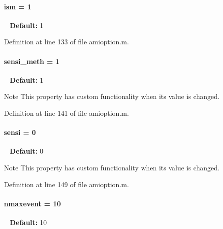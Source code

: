 \hypertarget{classamioption_aada9d6834569ad5c542cb8dc6b26ea46}{}
\paragraph[{ism}]{\setlength{\rightskip}{0pt plus 5cm}ism = 1}\label{classamioption_aada9d6834569ad5c542cb8dc6b26ea46}
~\newline
{\bfseries Default\+:} 1 

Definition at line 133 of file amioption.\+m.

\hypertarget{classamioption_ab31e219eb42bc06629c3f247a01b9906}{}
\paragraph[{sensi\+\_\+meth}]{\setlength{\rightskip}{0pt plus 5cm}sensi\+\_\+meth = 1}\label{classamioption_ab31e219eb42bc06629c3f247a01b9906}
~\newline
{\bfseries Default\+:} 1

\begin{DoxyNote}{Note}
This property has custom functionality when its value is changed. 
\end{DoxyNote}


Definition at line 141 of file amioption.\+m.

\hypertarget{classamioption_a7dd31d33463c5a709251bcef0eccaa36}{}
\paragraph[{sensi}]{\setlength{\rightskip}{0pt plus 5cm}sensi = 0}\label{classamioption_a7dd31d33463c5a709251bcef0eccaa36}
~\newline
{\bfseries Default\+:} 0

\begin{DoxyNote}{Note}
This property has custom functionality when its value is changed. 
\end{DoxyNote}


Definition at line 149 of file amioption.\+m.

\hypertarget{classamioption_a85519d27e7231ac625e5b2deee92165a}{}
\paragraph[{nmaxevent}]{\setlength{\rightskip}{0pt plus 5cm}nmaxevent = 10}\label{classamioption_a85519d27e7231ac625e5b2deee92165a}
~\newline
{\bfseries Default\+:} 10 

